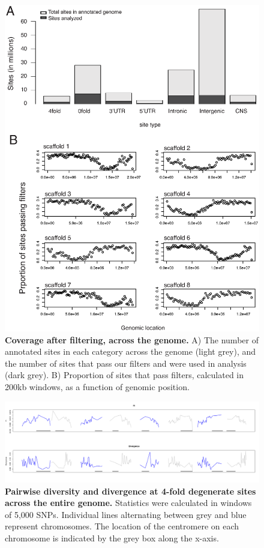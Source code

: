 \begin{figure}[ht!]
      \centering
       \includegraphics[width=\linewidth]{Ch2FigS1}
    \caption{\textbf{Coverage after filtering, across the genome.} A) The number of annotated sites in each category across the genome (light grey), and the number of sites that pass our filters and were used in analysis (dark grey). B) Proportion of sites that pass filters, calculated in 200kb windows, as a function of genomic position.}
    \label{fig:figS1}
\end{figure}

\begin{figure}[ht!]
      \centering
       \includegraphics[width=\linewidth]{Ch2FigS2.pdf}
    \caption{\textbf{Pairwise diversity and divergence at 4-fold degenerate sites across the entire genome.} Statistics were calculated in windows of 5,000 SNPs. Individual lines alternating between grey and blue represent chromosomes. The location of the centromere on each chromosome is indicated by the grey box along the x-axis.}
    \label{fig:figS2}
\end{figure}

